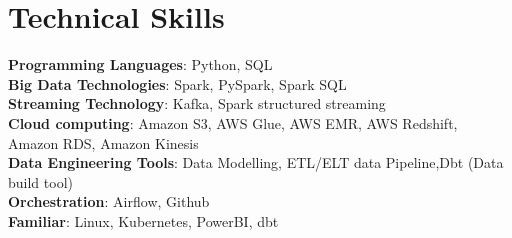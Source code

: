 \documentclass[letterpaper,11pt]{article}
\begin{document}
\section{Technical Skills}
 \begin{itemize}[leftmargin=0.15in, label={}]
    \small{\item{
     \textbf{Programming Languages}{:\hspace{0.06cm}  Python, SQL } \\
     \textbf{Big Data Technologies}{:\hspace{0.49cm}     Spark, PySpark, Spark SQL } \\
     \textbf{Streaming Technology}{:\hspace{0.51cm} Kafka, Spark structured streaming} \\
     \textbf{Cloud computing}{:\hspace{1.38cm} Amazon S3, AWS Glue, AWS EMR, AWS Redshift, Amazon RDS, Amazon Kinesis } \\
     \textbf{Data Engineering Tools}{:\hspace{0.28cm} Data Modelling, ETL/ELT data Pipeline,Dbt (Data build tool)}\\
     \textbf{Orchestration}{:\hspace{2.02cm} Airflow, Github} \\
     \textbf{Familiar}{:\hspace{3cm} Linux, Kubernetes, PowerBI, dbt} \\
     
     
    }}
 \end{itemize}

\end{document}
